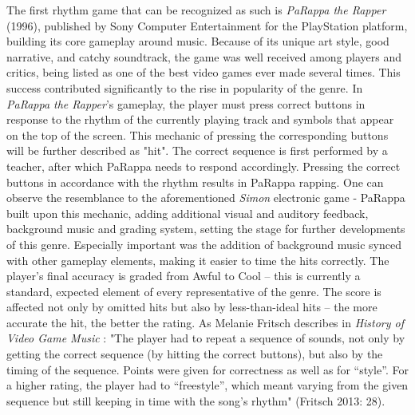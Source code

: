 The first rhythm game that can be recognized as such is \textit{PaRappa the Rapper} (1996), published by Sony Computer Entertainment for the PlayStation platform, building its core gameplay around music. Because of its unique art style, good narrative, and catchy soundtrack, the game was well received among players and critics, being listed as one of the best video games ever made several times. \cite{acclaimed_videogames_parappa} This success contributed significantly to the rise in popularity of the genre. In \textit{PaRappa the Rapper}'s gameplay, the player must press correct buttons in response to the rhythm of the currently playing track and symbols that appear on the top of the screen. This mechanic of pressing the corresponding buttons will be further described as "hit". The correct sequence is first performed by a teacher, after which PaRappa needs to respond accordingly. Pressing the correct buttons in accordance with the rhythm results in PaRappa rapping. One can observe the resemblance to the aforementioned \textit{Simon} electronic game - PaRappa built upon this mechanic, adding additional visual and auditory feedback, background music and grading system, setting the stage for further developments of this genre. Especially important was the addition of background music synced with other gameplay elements, making it easier to time the hits correctly. The player's final accuracy is graded from Awful to Cool -- this is currently a standard, expected element of every representative of the genre. The score is affected not only by omitted hits but also by less-than-ideal hits -- the more accurate the hit, the better the rating. As Melanie Fritsch describes in \textit{History of Video Game Music} \cite{MusicMedien}: "The player had to repeat a sequence of sounds, not only by getting the correct sequence (by hitting the correct buttons), but also by the timing of the sequence. Points were given for correctness as well as for “style”. For a higher rating, the player had to “freestyle”, which meant varying from the given sequence but still keeping in time with the song’s rhythm" (Fritsch 2013: 28).

